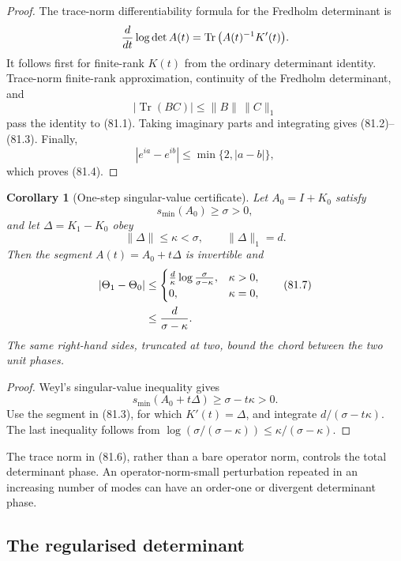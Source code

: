 \documentclass[11pt]{article}
\newtheorem{corollary}[theorem]{Corollary}
\begin{document}
\begin{proof}
The trace-norm differentiability formula for the Fredholm determinant
is
\[
 {d\over dt}\log\det A(t)
 =\operatorname{Tr}\big(A(t)^{-1}K'(t)\big).
\]
It follows first for finite-rank \(K(t)\) from the ordinary determinant
identity.  Trace-norm finite-rank approximation, continuity of the
Fredholm determinant, and
\[
 |\operatorname{Tr}(BC)|\le\|B\|\,\|C\|_1
\]
pass the identity to (81.1).  Taking imaginary parts and integrating
gives (81.2)--(81.3).  Finally,
\[
 |e^{ia}-e^{ib}|\le\min\{2,|a-b|\},
\]
which proves (81.4).
\end{proof}

\begin{corollary}[One-step singular-value certificate]
\label{cor:v11v81-one-step}
Let \(A_0=I+K_0\) satisfy
\[
                        s_{\min}(A_0)\ge\sigma>0,            \tag{81.5}
\]
and let \(\Delta=K_1-K_0\) obey
\[
                  \|\Delta\|\le\kappa<\sigma,\qquad
                  \|\Delta\|_1=d.                           \tag{81.6}
\]
Then the segment \(A(t)=A_0+t\Delta\) is invertible and
\[
 \begin{split}
 |\Theta_1-\Theta_0|
 &\le
 \begin{cases}
 {d\over\kappa}\log{\sigma\over\sigma-\kappa},&\kappa>0,\\
 0,&\kappa=0,
 \end{cases}                                                 \tag{81.7}\\
 &\le {d\over\sigma-\kappa}.
 \end{split}
\]
The same right-hand sides, truncated at two, bound the chord between
the two unit phases.
\end{corollary}

\begin{proof}
Weyl's singular-value inequality gives
\[
 s_{\min}(A_0+t\Delta)\ge\sigma-t\kappa>0.
\]
Use the segment in (81.3), for which \(K'(t)=\Delta\), and integrate
\(d/(\sigma-t\kappa)\).  The last inequality follows from
\(\log(\sigma/(\sigma-\kappa))\le
\kappa/(\sigma-\kappa)\).
\end{proof}

The trace norm in (81.6), rather than a bare operator norm, controls
the total determinant phase.  An operator-norm-small perturbation
repeated in an increasing number of modes can have an order-one or
divergent determinant phase.

\subsection{The regularised determinant}
\end{document}

